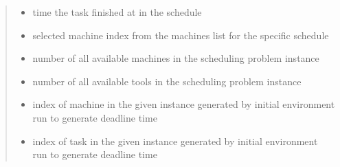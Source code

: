 \documentclass[letterpaper,10pt,english]{sphinxmanual}
\begin{document}
\begin{fulllineitems}
\begin{quote}
\begin{description}
\begin{itemize}
\item {} 
\sphinxAtStartPar
{} \textendash{} time the task finished at in the schedule

\item {} 
\sphinxAtStartPar
{} \textendash{} selected machine index from the machines list for the specific schedule

\item {} 
\sphinxAtStartPar
{} \textendash{} number of all available machines in the scheduling problem instance

\item {} 
\sphinxAtStartPar
{} \textendash{} number of all available tools in the scheduling problem instance

\item {} 
\sphinxAtStartPar
{} \textendash{} index of machine in the given instance generated by initial environment
run to generate deadline time

\item {} 
\sphinxAtStartPar
{} \textendash{} index of task in the given instance
generated by initial environment run to generate deadline time

\end{itemize}

\end{description}\end{quote}


\end{fulllineitems}
\end{document}
